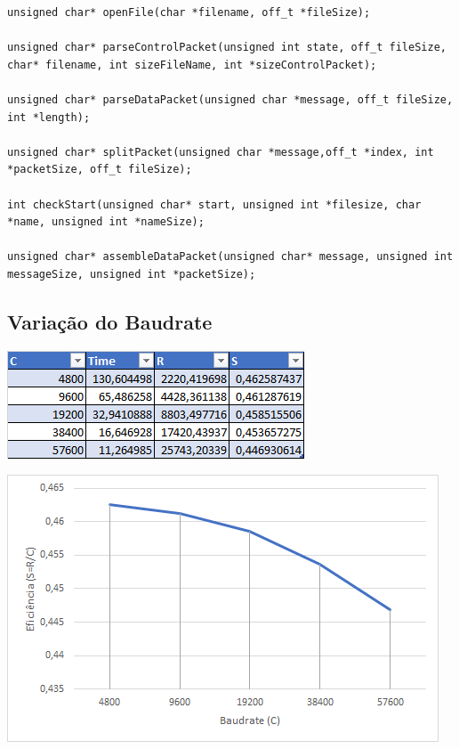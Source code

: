 \documentclass[11pt]{article}
\begin{document}
\begin{lstlisting}[style=CStyle]
unsigned char* openFile(char *filename, off_t *fileSize);

unsigned char* parseControlPacket(unsigned int state, off_t fileSize, char* filename, int sizeFileName, int *sizeControlPacket);

unsigned char* parseDataPacket(unsigned char *message, off_t fileSize, int *length);

unsigned char* splitPacket(unsigned char *message,off_t *index, int *packetSize, off_t fileSize);

int checkStart(unsigned char* start, unsigned int *filesize, char *name, unsigned int *nameSize);

unsigned char* assembleDataPacket(unsigned char* message, unsigned int messageSize, unsigned int *packetSize);

\end{lstlisting}

\pagebreak
 
\subsection{Variação do Baudrate}

\includegraphics[width=\textwidth]{tabelaBaudrate.png}

\bigskip
\bigskip

\includegraphics[width=\textwidth]{baudrate.png}
\end{document}
